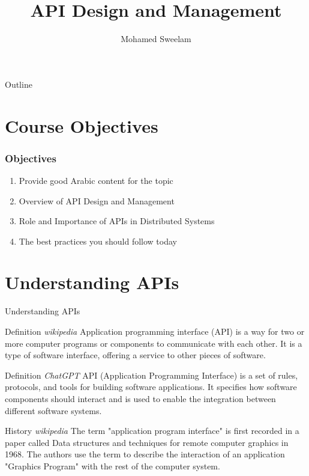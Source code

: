 \documentclass{beamer}
\title{API Design and Management}
\author{Mohamed Sweelam}
\institute{Software Engineer}
\date{}
\begin{document}
\begin{frame}
  \titlepage
\end{frame}

\begin{frame}{Outline}
  \tableofcontents
\end{frame}

\section{Course Objectives}
\begin{frame}
	\frametitle{Objectives} %
		\begin{enumerate}
			\item<1-> {Provide good Arabic content for the topic}
			\item<2-> {Overview of API Design and Management}
			\item<3-> {Role and Importance of APIs in Distributed Systems}
			\item<4-> {The best practices you should follow today}
		\end{enumerate}
\end{frame}

\section{Understanding APIs}
\begin{frame}{Understanding APIs}
	\begin{block}{Definition \tiny{\textit{wikipedia}}}
		\small{ Application programming interface (API) is a way for two or more computer programs or components to communicate with each other. It is a type of software interface, offering a service to other pieces of software.}
	\end{block}
	
	\begin{block}{Definition \tiny{\textit{ChatGPT}}}
		\small{ API (Application Programming Interface) is a set of rules, protocols, and tools for building software applications. It specifies how software components should interact and is used to enable the integration between different software systems. }
	\end{block}
	
	\begin{alertblock}{History \tiny{\textit{wikipedia}}}
		\small{ The term "application program interface" is first recorded in a paper called Data structures and techniques for remote computer graphics in 1968. The authors use the term to describe the interaction of an application "Graphics Program" with the rest of the computer system. }
	\end{alertblock}
  
\end{frame}
\end{document}
